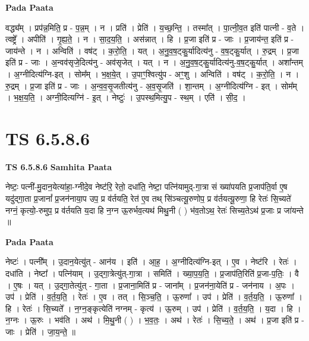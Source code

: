\documentclass[17pt]{extarticle}
\begin{document}
\textbf{Pada Paata} \newline

वद्ध्य᳚म् । प्रप॑न्न॒मिति॒ प्र - प॒न्न॒म् । न । प्रति॑ । प्रेति॑ । य॒च्छ॒न्ति॒ । तस्मा᳚त् । पा॒त्नी॒व॒त इति॑ पात्नी - व॒ते । त्वष्ट्रे᳚ । अपीति॑ । गृ॒ह्य॒ते॒ । न । सा॒द॒य॒ति॒ । अस॑न्नात् । हि । प्र॒जा इति॑ प्र - जाः । प्र॒जाय॑न्त॒ इति॑ प्र - जाय॑न्ते । न । अन्विति॑ । वष॑ट् । क॒रो॒ति॒ । यत् । अ॒नु॒व॒ष॒ट्कु॒र्यादित्य॑नु - व॒ष॒ट्कु॒र्यात् । रु॒द्रम् । प्र॒जा इति॑ प्र - जाः । अ॒न्वव॑सृजे॒दित्य॑नु - अव॑सृजेत् । यत् । न । अ॒नु॒व॒ष॒ट्कु॒र्यादित्य॑नु-व॒ष॒ट्कु॒र्यात् । अशा᳚न्तम् । अ॒ग्नीदित्य॑ग्नि-इत् । सोम᳚म् । भ॒क्ष॒ये॒त् ।  उ॒पाꣳ॒॒श्वित्यु॑प - अꣳ॒॒शु । अन्विति॑ । वष॑ट् । क॒रो॒ति॒ । न । रु॒द्रम् । प्र॒जा इति॑ प्र - जाः । अ॒न्व॒व॒सृ॒जतीत्य॑नु - अ॒व॒सृ॒जति॑ । शा॒न्तम् । अ॒ग्नीदित्य॑ग्नि - इत् । सोम᳚म् । भ॒क्ष॒य॒ति॒ । अग्नी॒दित्यग्नि॑ - इ॒त् । नेष्टुः॑ । उ॒पस्थ॒मित्यु॒प - स्थ॒म् । एति॑ । सी॒द॒ ।  \newline





\section{ TS 6.5.8.6 }

\textbf{TS 6.5.8.6 } \newline
\textbf{Samhita Paata} \newline

नेष्टः॒ पत्नी॑-मु॒दान॒येत्या॑हा॒-ग्नीदे॒व नेष्ट॑रि॒ रेतो॒ दधा॑ति॒ नेष्टा॒ पत्नि॑यामुद्-गा॒त्रा सं ख्या॑पयति प्र॒जाप॑ति॒र्वा ए॒ष यदु॑द्गा॒ता प्र॒जानां᳚ प्र॒जन॑नाया॒प उप॒ प्र व॑र्तयति॒ रेत॑ ए॒व तथ् सि॑ञ्चत्यू॒रुणोप॒ प्र व॑र्तयत्यू॒रुणा॒ हि रेतः॑ सि॒च्यते॑ नग्नं॒ कृत्यो॒-रुमुप॒ प्र व॑र्तयति य॒दा हि न॒ग्न ऊ॒रुर्भव॒त्यथ॑ मिथु॒नी ( ) भ॑व॒तोऽथ॒ रेतः॑ सिच्य॒तेऽथ॑ प्र॒जाः प्र जा॑यन्ते ॥ \newline

\textbf{Pada Paata} \newline

नेष्टः॑ । पत्नी᳚म् । उ॒दान॒येत्यु॑त् - आन॑य । इति॑ । आ॒ह॒ । अ॒ग्नीदित्य॑ग्नि-इत् । ए॒व । नेष्ट॑रि । रेतः॑ । दधा॑ति । नेष्टा᳚ । पत्नि॑याम् । उ॒द्गा॒त्रेत्यु॑त्-गा॒त्रा । समिति॑ । ख्या॒प॒य॒ति॒ । प्र॒जाप॑ति॒रिति॑ प्र॒जा-प॒तिः॒ । वै । ए॒षः । यत् । उ॒द्गा॒तेत्यु॑त् - गा॒ता । प्र॒जाना॒मिति॑ प्र - जाना᳚म् । प्र॒जन॑ना॒येति॑ प्र - जन॑नाय । अ॒पः । उप॑ । प्रेति॑ । व॒र्त॒य॒ति॒ । रेतः॑ । ए॒व । तत् । सि॒ञ्च॒ति॒ । ऊ॒रुणा᳚ । उप॑ । प्रेति॑ । व॒र्त॒य॒ति॒ । ऊ॒रुणा᳚ । हि । रेतः॑ । सि॒च्यते᳚ । न॒ग्न॒ङ्कृत्येति॑ नग्नम् - कृत्य॑ । ऊ॒रुम् । उप॑ । प्रेति॑ । व॒र्त॒य॒ति॒ । य॒दा । हि । न॒ग्नः । ऊ॒रुः । भव॑ति । अथ॑ । मि॒थु॒नी ( ) । भ॒व॒तः॒ । अथ॑ । रेतः॑ । सि॒च्य॒ते॒ । अथ॑ । प्र॒जा इति॑ प्र - जाः । प्रेति॑ । जा॒य॒न्ते॒ ॥  \newline
\end{document}
